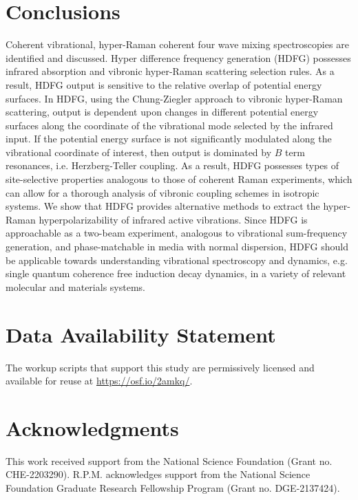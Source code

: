 \documentclass[aip, jcp, reprint, onecolumn, nofootinbib]{revtex4-2}
\begin{document}
\section{Conclusions}\label{conclusion}
Coherent vibrational, hyper-Raman coherent four wave mixing spectroscopies are identified and discussed.
Hyper difference frequency generation (HDFG) possesses infrared absorption and vibronic hyper-Raman scattering selection rules.
As a result, HDFG output is sensitive to the relative overlap of potential energy surfaces.
In HDFG, using the Chung-Ziegler approach to vibronic hyper-Raman scattering, output is dependent upon changes in different potential energy surfaces along the coordinate of the vibrational mode selected by the infrared input. 
If the potential energy surface is not significantly modulated along the vibrational coordinate of interest, then output is dominated by $B$ term resonances, i.e. Herzberg-Teller coupling.
As a result, HDFG possesses types of site-selective properties analogous to those of coherent Raman experiments, which can allow for a thorough analysis of vibronic coupling schemes in isotropic systems.
We show that HDFG provides alternative methods to extract the hyper-Raman hyperpolarizability of infrared active vibrations. 
Since HDFG is approachable as a two-beam experiment, analogous to vibrational sum-frequency generation, and phase-matchable in media with normal dispersion, HDFG should be applicable towards understanding vibrational spectroscopy and dynamics, e.g. single quantum coherence free induction decay dynamics, in a variety of relevant molecular and materials systems.  

\section{Data Availability Statement}
The workup scripts that support this study are permissively licensed and available for reuse at \href{https://osf.io/2amkq/}{https://osf.io/2amkq/}.

\section{Acknowledgments}
This work received support from the National Science Foundation (Grant no. CHE-2203290).
R.P.M. acknowledges support from the National Science Foundation Graduate Research Fellowship Program (Grant no. DGE-2137424). 
\end{document}
